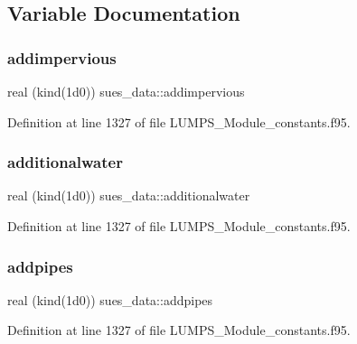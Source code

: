 \subsection{Variable Documentation}
\mbox{\label{namespacesues__data_af0fed458b1eefc0164c4ffb6d6e2d1a2}} 
\subsubsection{\texorpdfstring{addimpervious}{addimpervious}}
{\footnotesize\ttfamily real (kind(1d0)) sues\+\_\+data\+::addimpervious}



Definition at line 1327 of file L\+U\+M\+P\+S\+\_\+\+Module\+\_\+constants.\+f95.

\mbox{\label{namespacesues__data_a2c84a8e635e90b198dc0fd4c93c51ba4}} 
\subsubsection{\texorpdfstring{additionalwater}{additionalwater}}
{\footnotesize\ttfamily real (kind(1d0)) sues\+\_\+data\+::additionalwater}



Definition at line 1327 of file L\+U\+M\+P\+S\+\_\+\+Module\+\_\+constants.\+f95.

\mbox{\label{namespacesues__data_a58a8108dff93f602ad2ef840fef9395f}} 
\subsubsection{\texorpdfstring{addpipes}{addpipes}}
{\footnotesize\ttfamily real (kind(1d0)) sues\+\_\+data\+::addpipes}



Definition at line 1327 of file L\+U\+M\+P\+S\+\_\+\+Module\+\_\+constants.\+f95.

\mbox{\label{namespacesues__data_a2553d0e5b7218422246f2078b379fed5}} 
